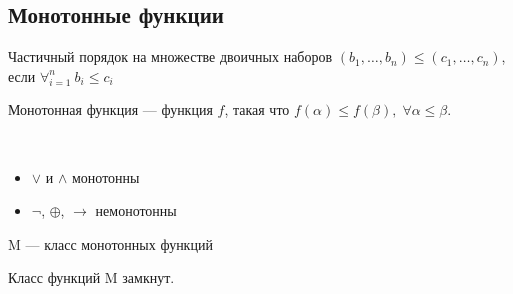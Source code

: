 \subsection{Монотонные функции}

\begin{defn}
    Частичный порядок на множестве двоичных наборов $(b_1, \ldots, b_n) \leq (c_1, \ldots, c_n)$, если $\forall_{i=1}^{n} \ b_i \leq c_i$ 
\end{defn}

\begin{defn}
    Монотонная функция --- функция $f$,  такая что $f(\alpha ) \le f(\beta), \; \forall \alpha \le \beta$.
\end{defn}

\begin{examples}~
    \begin{itemize}
        \item $\vee$ и $\wedge$ монотонны
        \item $\neg$, $\oplus$, $\rightarrow$ немонотонны
    \end{itemize}
\end{examples}

\begin{theorem-non}
    M --- класс монотонных функций
\end{theorem-non}

\begin{theorem-non}
    Класс функций M замкнут.
\end{theorem-non}